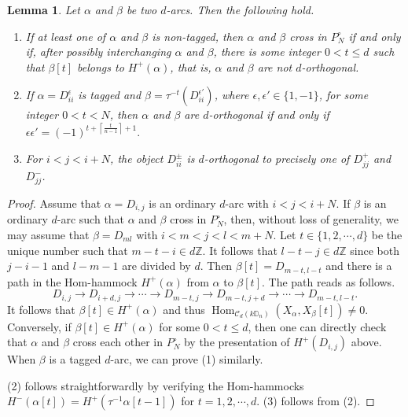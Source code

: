 \documentclass[12pt]{article}
\theoremstyle{plain}
\newtheorem{Lem}[Def]{Lemma}
\theoremstyle{definition}
\DeclareMathOperator{\Hom}{Hom}
\renewcommand{\leq}{\leqslant}
\begin{document}
\begin{Lem}\label{lem-non-crossing}
Let $\alpha$ and $\beta$ be two $d$-arcs. Then the following hold. 
\begin{enumerate}
    \item If at least one of $\alpha$ and $\beta$ is non-tagged, then $\alpha$ and $\beta$ cross in $P_N^\circ$ if and only if, after possibly interchanging $\alpha$ and $\beta$, there is some integer $0<t\leq d$ such that $\beta[t]$ belongs to $H^+(\alpha)$, that is, $\alpha$ and $\beta$ are not $d$-orthogonal. 
    \item If \(\alpha=D_{ii}^{\epsilon}\) is tagged and \(\beta=\tau^{-t}(D_{ii}^{\epsilon'})\), where \(\epsilon,\epsilon'\in\{1,-1\}\), for some integer \(0<t<N\), then \(\alpha\) and \(\beta\) are \(d\)-orthogonal 
    if and only if 
	    \(\epsilon\epsilon'=(-1)^{t+\left\lceil\frac{t}{n-1}\right\rceil+1}.\)
   \item For $i<j<i+N$, the object  $D_{ii}^{\pm}$ is $d$-orthogonal to precisely one of $D_{jj}^{+}$ and $D_{jj}^{-}$. 
\end{enumerate}
\end{Lem}
\begin{proof}
Assume that $\alpha=D_{i,j}$ is an ordinary $d$-arc with $i<j<i+N$. If $\beta$ is an ordinary $d$-arc such that $\alpha$ and $\beta$ cross in $P_N^\circ$, then, without loss of generality, we may assume that $\beta=D_{ml}$ with $i<m<j<l<m+N$. Let $t\in\{1,2,\cdots,d\}$ be the unique number such that $m-t-i\in d\mathbb{Z}$. It follows that $l-t-j\in d\mathbb{Z}$ since both $j-i-1$ and $l-m-1$ are divided by $d$.  Then $\beta[t]=D_{m-t,l-t}$ and there is a path in the Hom-hammock $H^+(\alpha)$ from $\alpha$ to $\beta[t]$. The path reads as follows. 
\[D_{i,j}\rightarrow D_{i+d,j}\rightarrow\cdots\rightarrow D_{m-t,j}\rightarrow D_{m-t,j+d}\rightarrow\cdots\rightarrow D_{m-t,l-t}.\]
It follows that $\beta[t]\in H^+(\alpha)$ and thus $\Hom_{\mathcal{C}_d(k\mathbb{D}_n)}(X_{\alpha}, X_{\beta}[t])\neq 0$.  Conversely, if $\beta[t]\in H^+(\alpha)$ for some $0<t\leq d$, then one can directly check that $\alpha$ and $\beta$ cross each other in $P_N^{\circ}$ by the presentation of $H^+(D_{i,j})$ above. When $\beta$ is a tagged $d$-arc, we can prove (1) similarly. 

(2) follows straightforwardly by verifying the Hom-hammocks $H^-(\alpha[t])=H^+(\tau^{-1}\alpha[t-1])$ for $t=1,2,\cdots,d$. (3) follows from (2). 
\end{proof}
\end{document}
